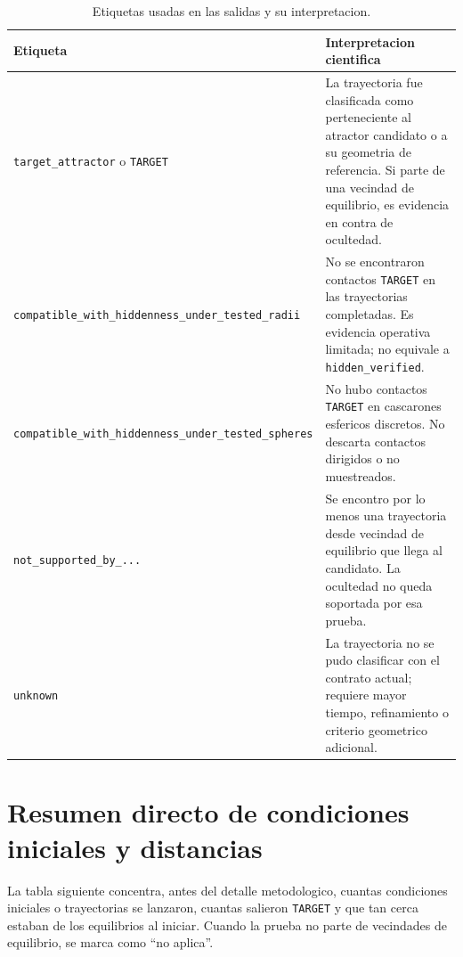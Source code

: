 \documentclass[11pt]{article}
\newcommand{\status}[1]{\texttt{\small #1}}
\newcommand{\target}{\texttt{TARGET}}
\newcommand{\hiddenverified}{\texttt{hidden\_verified}}
\begin{document}
\begin{table}[h]
\centering
\caption{Etiquetas usadas en las salidas y su interpretacion.}
\small
\begin{tabularx}{\textwidth}{L{0.29\textwidth}L{0.64\textwidth}}
\toprule
Etiqueta & Interpretacion cientifica \\
\midrule
\status{target\_attractor} o \target{} &
La trayectoria fue clasificada como perteneciente al atractor candidato o a su
geometria de referencia. Si parte de una vecindad de equilibrio, es evidencia
en contra de ocultedad. \\
\status{compatible\_with\_hiddenness\_under\_tested\_radii} &
No se encontraron contactos \target{} en las trayectorias completadas. Es
evidencia operativa limitada; no equivale a \hiddenverified. \\
\status{compatible\_with\_hiddenness\_under\_tested\_spheres} &
No hubo contactos \target{} en cascarones esfericos discretos. No descarta
contactos dirigidos o no muestreados. \\
\status{not\_supported\_by\_...} &
Se encontro por lo menos una trayectoria desde vecindad de equilibrio que llega
al candidato. La ocultedad no queda soportada por esa prueba. \\
\status{unknown} &
La trayectoria no se pudo clasificar con el contrato actual; requiere mayor
tiempo, refinamiento o criterio geometrico adicional. \\
\bottomrule
\end{tabularx}
\end{table}

\section{Resumen directo de condiciones iniciales y distancias}

La tabla siguiente concentra, antes del detalle metodologico, cuantas
condiciones iniciales o trayectorias se lanzaron, cuantas salieron \target{} y
que tan cerca estaban de los equilibrios al iniciar. Cuando la prueba no parte
de vecindades de equilibrio, se marca como ``no aplica''.
\end{document}
